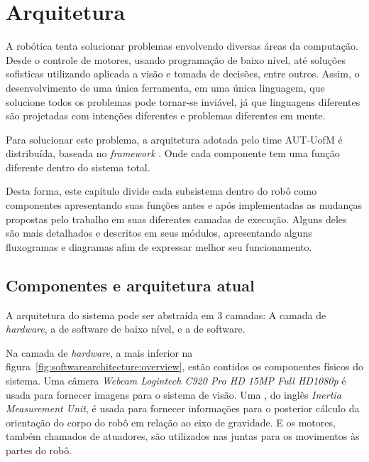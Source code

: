 \chapter{Arquitetura}
\label{ch:architecture}

A robótica tenta solucionar problemas envolvendo diversas áreas da computação. Desde o controle de motores, usando programação de baixo nível, até soluções sofisticas utilizando  aplicada a visão e tomada de decisões, entre outros. Assim, o desenvolvimento de uma única ferramenta, em uma única linguagem, que solucione todos os problemas pode tornar-se inviável, já que linguagens diferentes são projetadas com intenções diferentes e problemas diferentes em mente.

Para solucionar este problema, a arquitetura adotada pelo time AUT-UofM é distribuída, baseada no \textit{framework} . Onde cada componente tem uma função diferente dentro do sistema total. 

Desta forma, este capítulo divide cada subsistema dentro do robô como componentes apresentando suas funções antes e após implementadas as mudanças propostas pelo trabalho em suas diferentes camadas de execução. Alguns deles são mais detalhados e descritos em seus módulos, apresentando alguns fluxogramas e diagramas afim de expressar melhor seu funcionamento.

\section{Componentes e arquitetura atual}
\label{sec:architecture:current_components_and_architecture}

A arquitetura do sistema pode ser abstraída em $3$ camadas: A camada de \textit{hardware}, a de software de baixo nível, e a de software.

Na camada de \textit{hardware}, a mais inferior na figura~\ref{fig:softwarearchitecture:overview}, estão contidos os componentes físicos do sistema. Uma câmera \textit{Webcam Logintech C920 Pro HD 15MP Full HD1080p} é usada para fornecer imagens para o sistema de visão. Uma , do inglês \textit{Inertia Measurement Unit}, é usada para fornecer informações para o posterior cálculo da orientação do corpo do robô em relação ao eixo de gravidade. E os motores, também chamados de atuadores, são utilizados nas juntas para os movimentos às partes do robô.

